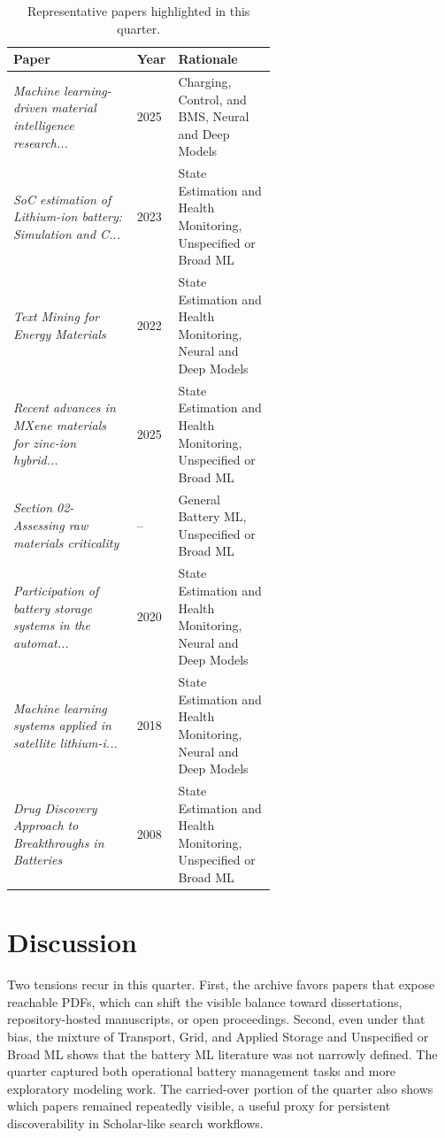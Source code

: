 \documentclass[conference]{IEEEtran}
\begin{document}
\begin{table}[t]
\caption{Representative papers highlighted in this quarter.}
\label{tab:notable}
\centering
\footnotesize
\begin{tabularx}{\linewidth}{p{0.47\linewidth} p{0.12\linewidth} X}
\toprule
Paper & Year & Rationale \\
\midrule
\textit{Machine learning-driven material intelligence research...} \cite{machinelearningdriven2025} & 2025 & Charging, Control, and BMS, Neural and Deep Models \\
\textit{SoC estimation of Lithium-ion battery: Simulation and C...} \cite{socestimationof2023} & 2023 & State Estimation and Health Monitoring, Unspecified or Broad ML \\
\textit{Text Mining for Energy Materials} \cite{textminingfor2022} & 2022 & State Estimation and Health Monitoring, Neural and Deep Models \\
\textit{Recent advances in MXene materials for zinc-ion hybrid...} \cite{recentadvancesin2025} & 2025 & State Estimation and Health Monitoring, Unspecified or Broad ML \\
\textit{Section 02-Assessing raw materials criticality} \cite{section02assessingna} & -- & General Battery ML, Unspecified or Broad ML \\
\textit{Participation of battery storage systems in the automat...} \cite{participationofbattery2020} & 2020 & State Estimation and Health Monitoring, Neural and Deep Models \\
\textit{Machine learning systems applied in satellite lithium-i...} \cite{machinelearningsystems2018} & 2018 & State Estimation and Health Monitoring, Neural and Deep Models \\
\textit{Drug Discovery Approach to Breakthroughs in Batteries} \cite{drugdiscoveryapproach2008} & 2008 & State Estimation and Health Monitoring, Unspecified or Broad ML \\
\bottomrule
\end{tabularx}
\end{table}

\section{Discussion}
Two tensions recur in this quarter. First, the archive favors papers that expose reachable PDFs, which can shift the visible balance toward dissertations, repository-hosted manuscripts, or open proceedings. Second, even under that bias, the mixture of Transport, Grid, and Applied Storage and Unspecified or Broad ML shows that the battery ML literature was not narrowly defined. The quarter captured both operational battery management tasks and more exploratory modeling work. The carried-over portion of the quarter also shows which papers remained repeatedly visible, a useful proxy for persistent discoverability in Scholar-like search workflows.
\end{document}
